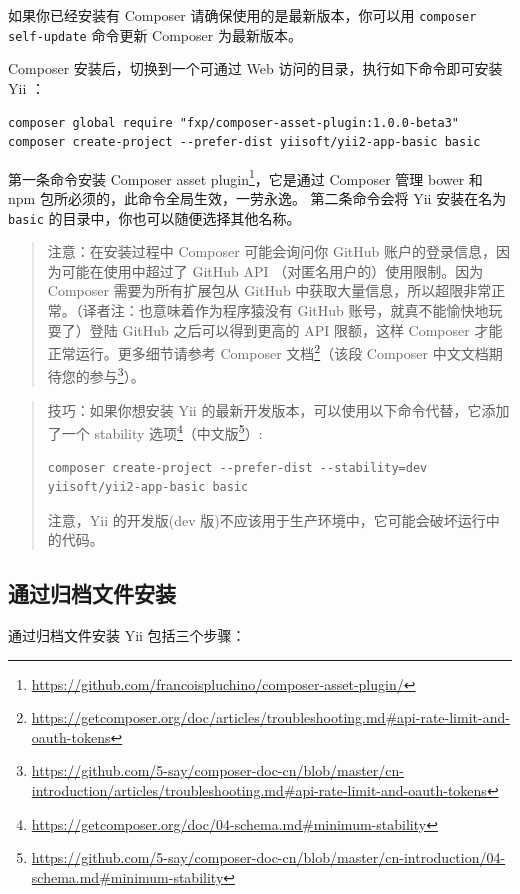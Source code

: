 如果你已经安装有 Composer 请确保使用的是最新版本，你可以用 \lstinline|composer self-update| 命令更新 Composer 为最新版本。

Composer 安装后，切换到一个可通过 Web 访问的目录，执行如下命令即可安装 Yii ：

\begin{lstlisting}
composer global require "fxp/composer-asset-plugin:1.0.0-beta3"
composer create-project --prefer-dist yiisoft/yii2-app-basic basic
\end{lstlisting}
第一条命令安装 Composer asset plugin\footnote{\url{https://github.com/francoispluchino/composer-asset-plugin/}}，它是通过 Composer 管理 bower 和 npm 包所必须的，此命令全局生效，一劳永逸。
第二条命令会将 Yii 安装在名为 \lstinline|basic| 的目录中，你也可以随便选择其他名称。

\begin{quote}注意：在安装过程中 Composer 可能会询问你 GitHub 账户的登录信息，因为可能在使用中超过了 GitHub API 
（对匿名用户的）使用限制。因为 Composer 需要为所有扩展包从 GitHub 
中获取大量信息，所以超限非常正常。（译者注：也意味着作为程序猿没有 GitHub 账号，就真不能愉快地玩耍了）登陆 GitHub 
之后可以得到更高的 API 限额，这样 Composer 才能正常运行。更多细节请参考 Composer 
文档\footnote{\url{https://getcomposer.org/doc/articles/troubleshooting.md\#api-rate-limit-and-oauth-tokens}}（该段 Composer 
中文文档期待您的参与\footnote{\url{https://github.com/5-say/composer-doc-cn/blob/master/cn-introduction/articles/troubleshooting.md\#api-rate-limit-and-oauth-tokens}}）。

\end{quote}
\begin{quote}技巧：如果你想安装 Yii 的最新开发版本，可以使用以下命令代替，它添加了一个 stability 选项\footnote{\url{https://getcomposer.org/doc/04-schema.md\#minimum-stability}}（中文版\footnote{\url{https://github.com/5-say/composer-doc-cn/blob/master/cn-introduction/04-schema.md\#minimum-stability}}）:

\begin{lstlisting}
composer create-project --prefer-dist --stability=dev yiisoft/yii2-app-basic basic
\end{lstlisting}
注意，Yii 的开发版(dev 版)不应该用于生产环境中，它可能会破坏运行中的代码。

\end{quote}
\subsection{通过归档文件安装 \label{start-installation.md::installing-from-archive-file}}
通过归档文件安装 Yii 包括三个步骤：

